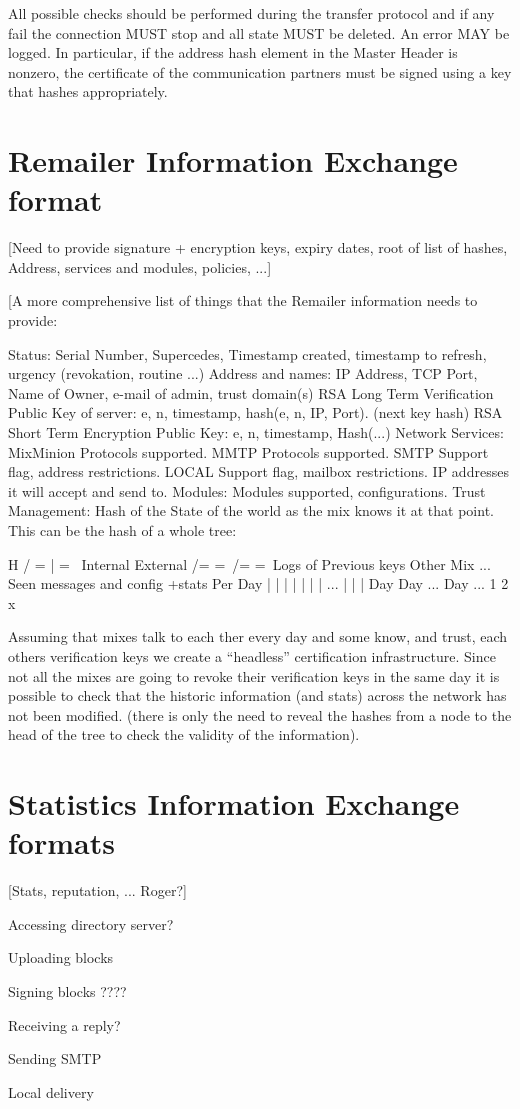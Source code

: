 All possible checks should be performed during the transfer protocol
and if any fail the connection MUST stop and all state MUST
be deleted. An error MAY be logged. In particular, if the address
hash element in the Master Header is nonzero, the certificate of
the communication partners must be signed using a key that hashes
appropriately.

\section{Remailer Information Exchange format}

[Need to provide signature + encryption keys, expiry dates, root of
list of hashes, Address, services and modules, policies, ...]

[A more comprehensive list of things that the Remailer information
needs to provide:

Status: Serial Number, Supercedes, Timestamp created, timestamp to
        refresh, urgency (revokation, routine ...)	  
Address and names: IP Address, TCP Port, Name of Owner, e-mail of
                   admin, trust domain(s) 
RSA Long Term Verification Public Key of server: e, n, timestamp,
                   hash(e, n, IP, Port). (next key hash)
RSA Short Term Encryption Public Key: e, n, timestamp, Hash(...)
Network Services: MixMinion Protocols supported.
		  MMTP Protocols supported.
	          SMTP Support flag, address restrictions.
                  LOCAL Support flag, mailbox restrictions.
	          IP addresses it will accept and send to.
Modules: Modules supported, configurations.
Trust Management: Hash of the State of the world as the mix knows it at
        that point. This can be the hash of a whole tree:

		           H
             / =           |                   = \
	Internal                               External
 /=                  =\                     /=        =\
Logs of           Previous keys          Other Mix    ...
Seen messages     and config +stats       Per Day
|   |    |   |    |   |   |  ...          |   |   |
Day Day ...  Day  ...
1   2        x


Assuming that mixes talk to each ther every day and some know, and
trust, each others verification keys we create a ``headless''
certification infrastructure. Since not all the mixes are going to
revoke their verification keys in the same day it is possible to 
check that the historic information (and stats) across the network has
not been modified. (there is only the need to reveal the hashes from a
node to the head of the tree to check the validity of the information).

\section{Statistics Information Exchange formats}

[Stats, reputation, ... Roger?]

Accessing directory server?

Uploading blocks

Signing blocks ????

Receiving a reply?

Sending SMTP

Local delivery

